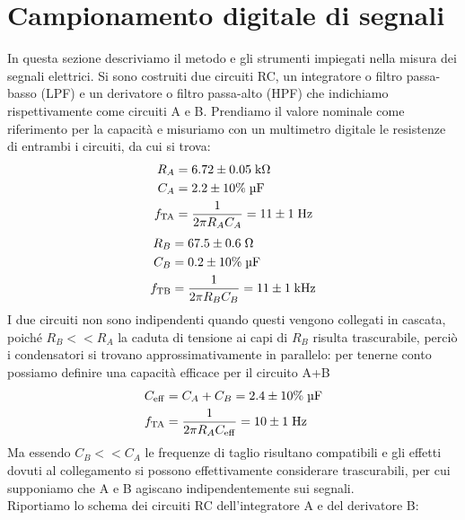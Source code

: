 \documentclass{article}[a4paper, oneside ,11pt]
\begin{document}
\section{Campionamento digitale di segnali}
In questa sezione descriviamo il metodo e gli strumenti impiegati nella misura dei segnali elettrici.
Si sono costruiti due circuiti RC, un integratore o filtro passa-basso (LPF) e un derivatore o filtro passa-alto (HPF) che indichiamo rispettivamente come circuiti A e B. Prendiamo il valore nominale come riferimento per la capacità e misuriamo con un multimetro digitale le resistenze di entrambi i circuiti, da cui si trova:
\begin{align*}
R_A &= 6.72 \pm 0.05 \; \si{\kilo\ohm}\\
C_A &= 2.2 \pm 10\% \; \si{\micro\F}\\
f_{\rm TA} &= \frac{1}{2 \pi R_A C_A} = 11 \pm 1 \; \si{\hertz}
\end{align*}
\begin{align*}
R_B &= 67.5 \pm 0.6 \; \si{\ohm}\\
C_B &= 0.2 \pm 10\% \; \si{\micro\F}\\
f_{\rm TB} &= \frac{1}{2 \pi R_B C_B} = 11 \pm 1 \; \si{\kilo\hertz}
\end{align*}
I due circuiti non sono indipendenti quando questi vengono collegati in cascata, poiché $R_B << R_A$ la caduta di tensione ai capi di $R_B$ risulta trascurabile, perciò i condensatori si trovano approssimativamente in parallelo: per tenerne conto possiamo definire una capacità efficace per il circuito A+B
\begin{align*}
C_{\rm eff} &= C_A + C_B = 2.4 \pm 10\% \; \si{\micro\F}\\
f_{\rm TA} &= \frac{1}{2 \pi R_A C_{\rm eff}} = 10 \pm 1 \; \si{\hertz}
\end{align*}
Ma essendo $C_B << C_A$ le frequenze di taglio risultano compatibili e gli effetti dovuti al collegamento si possono effettivamente considerare trascurabili, per cui supponiamo che A e B agiscano indipendentemente sui segnali.\\
Riportiamo lo schema dei circuiti RC dell'integratore A e del derivatore B:
\end{document}
